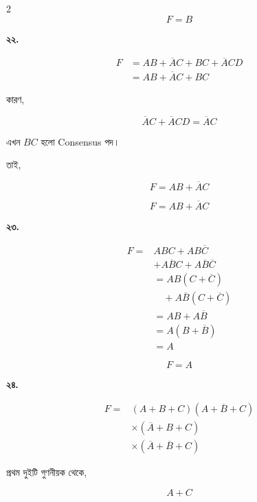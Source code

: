 \begin{multicols}{2}
\[
\boxed{F=B}
\]

\medskip


\textbf{২২.}

\[
\begin{aligned}
F
&=AB+\overline AC+BC+\overline ACD\\
&=AB+\overline AC+BC
\end{aligned}
\]

কারণ,

\[
\overline AC+\overline ACD=\overline AC
\]

এখন \(BC\) হলো \textenglish{Consensus} পদ।

তাই,

\[
F=AB+\overline AC
\]

\[
\boxed{F=AB+\overline AC}
\]

\medskip


\textbf{২৩.}

\[
\begin{aligned}
F
={}&ABC+AB\overline C\\
&+A\overline BC+A\overline B\overline C\\
&=AB(C+\overline C)\\
&\quad+A\overline B(C+\overline C)\\
&=AB+A\overline B\\
&=A(B+\overline B)\\
&=A
\end{aligned}
\]

\[
\boxed{F=A}
\]

\medskip


\textbf{২৪.}

\[
\begin{aligned}
F
={}&(A+B+C)(A+\overline B+C)\\
&\times(\overline A+B+C)\\
&\times(\overline A+\overline B+C)
\end{aligned}
\]

প্রথম দুইটি গুণনীয়ক থেকে,

\[
A+C
\]


\end{multicols}
